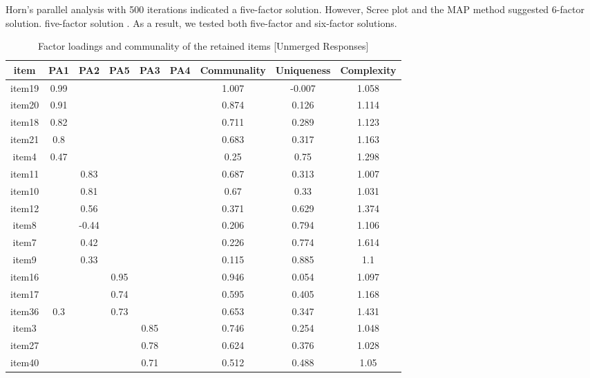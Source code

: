 \begin{appendix}
Horn's parallel analysis with 500 iterations indicated a five-factor
solution. However, Scree plot and the MAP method suggested 6-factor
solution. five-factor solution . As a result, we tested both five-factor
and six-factor solutions.

\begin{table}[h]

\begin{center}
\begin{threeparttable}

\caption{\label{tab:EFATableAppB}Factor loadings and communality of the retained items [Unmerged Responses]}

\small{

\begin{tabular}{ccccccccc}
\toprule
item & \multicolumn{1}{c}{PA1} & \multicolumn{1}{c}{PA2} & \multicolumn{1}{c}{PA5} & \multicolumn{1}{c}{PA3} & \multicolumn{1}{c}{PA4} & \multicolumn{1}{c}{Communality} & \multicolumn{1}{c}{Uniqueness} & \multicolumn{1}{c}{Complexity}\\
\midrule
item19 & 0.99 &  &  &  &  & 1.007 & -0.007 & 1.058\\
item20 & 0.91 &  &  &  &  & 0.874 & 0.126 & 1.114\\
item18 & 0.82 &  &  &  &  & 0.711 & 0.289 & 1.123\\
item21 & 0.8 &  &  &  &  & 0.683 & 0.317 & 1.163\\
item4 & 0.47 &  &  &  &  & 0.25 & 0.75 & 1.298\\
item11 &  & 0.83 &  &  &  & 0.687 & 0.313 & 1.007\\
item10 &  & 0.81 &  &  &  & 0.67 & 0.33 & 1.031\\
item12 &  & 0.56 &  &  &  & 0.371 & 0.629 & 1.374\\
item8 &  & -0.44 &  &  &  & 0.206 & 0.794 & 1.106\\
item7 &  & 0.42 &  &  &  & 0.226 & 0.774 & 1.614\\
item9 &  & 0.33 &  &  &  & 0.115 & 0.885 & 1.1\\
item16 &  &  & 0.95 &  &  & 0.946 & 0.054 & 1.097\\
item17 &  &  & 0.74 &  &  & 0.595 & 0.405 & 1.168\\
item36 & 0.3 &  & 0.73 &  &  & 0.653 & 0.347 & 1.431\\
item3 &  &  &  & 0.85 &  & 0.746 & 0.254 & 1.048\\
item27 &  &  &  & 0.78 &  & 0.624 & 0.376 & 1.028\\
item40 &  &  &  & 0.71 &  & 0.512 & 0.488 & 1.05\\

\end{tabular}}
\end{threeparttable}
\end{center}
\end{table}
\end{appendix}
